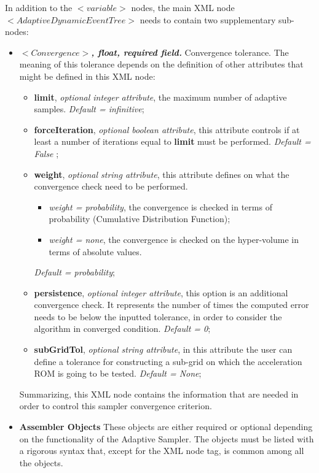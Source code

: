  In addition to the $<variable>$ nodes,  the main XML node $<AdaptiveDynamicEventTree>$ needs to contain two supplementary sub-nodes:
\begin{itemize}
  \item $<Convergence>$\textbf{\textit{, float, required field.}} Convergence tolerance. The meaning of this tolerance depends on the definition of other attributes that might be defined in this XML node:
     \begin{itemize}
         \item \textbf{limit}, \textit{optional integer attribute}, the maximum number of adaptive samples. \textit{Default = infinitive};
         \item \textbf{forceIteration}, \textit{optional boolean attribute}, this attribute controls if at least a number of iterations equal to \textbf{limit} must be performed.  \textit{Default = False} ;
         \item \textbf{weight}, \textit{optional string attribute}, this attribute defines on what the convergence check need to be performed.
          \begin{itemize}
             \item \textit{weight = probability}, the convergence is checked in terms of probability (Cumulative Distribution Function);
             \item \textit{weight = none}, the convergence is checked on the hyper-volume in terms of absolute values.
          \end{itemize}
          \textit{Default = probability};
         \item \textbf{persistence}, \textit{optional integer attribute}, this option is an additional convergence check. It represents the number of times the computed error needs to be below the inputted tolerance, in order to consider the algorithm in converged condition.  \textit{Default = 0};
         \item \textbf{subGridTol}, \textit{optional string attribute}, in this attribute the user can define a tolerance for constructing a sub-grid on which the acceleration ROM is going to be tested. \textit{Default = None};
      \end{itemize}
   Summarizing,  this XML node contains the information that are needed in order to control this sampler convergence criterion.
   \item \textbf{Assembler Objects} These objects are either required or optional depending on the functionality of the Adaptive Sampler. The objects must be listed with a rigorous syntax that, except for the XML node tag, is common among all the objects.

\end{itemize}
